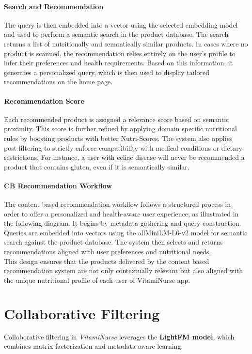 \paragraph{Search and Recommendation}

The query is then embedded into a vector using the selected embedding
model and used to perform a semantic search in the product database.
The search returns a list of nutritionally and semantically similar products.
In cases where no product is scanned, the recommendation relies entirely
on the user’s profile to infer their preferences and health requirements.
Based on this information, it generates a personalized query, which is
then used to display tailored recommendations on the home page.

\paragraph{Recommendation Score}

Each recommended product is assigned a relevance score based on semantic proximity. This score is further refined by applying domain specific
nutritional rules by boosting products with better Nutri-Scores. The
system also applies post-filtering to strictly enforce compatibility with
medical conditions or dietary restrictions. For instance, a user with celiac
disease will never be recommended a product that contains gluten, even
if it is semantically similar.
\paragraph{CB Recommendation Workflow}

The content based recommendation workflow follows a structured process
in order to offer a personalized and health-aware user experience, as
illustrated in the following diagram. It begins by metadata gathering
and query construction. Queries are embedded into vectors using the allMiniLM-L6-v2 model for semantic search against the product database.
The system then selects and returns recommendations aligned with user
preferences and nutritional needs.\\
This design ensures that the products delivered by the content based
recommendation system are not only contextually relevant but also
aligned with the unique nutritional profile of each user of VitamiNurse
app.
\section{Collaborative Filtering}
Collaborative filtering in \textit{VitamiNurse} leverages the \textbf{LightFM model},
which combines matrix factorization and metadata-aware learning.
